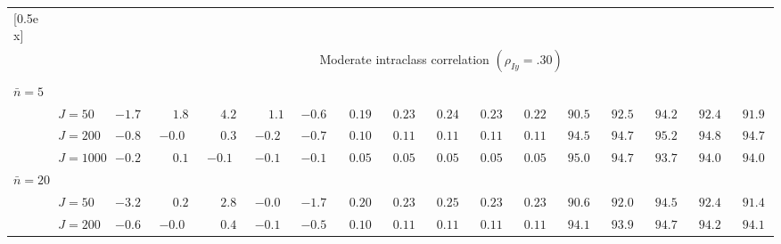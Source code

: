 \begin{sidewaystable}
\begin{threeparttable}
\begin{tabular}{llccccccccccccccc}
[0.5ex]\hline\\[-1.6ex] 
& & \multicolumn{15}{c}{Moderate intraclass correlation $(\rho_{Iy}=.30)$} \\[0.6ex]\hline\\[-1.8ex]
\multicolumn{4}{l}{$\bar{n}=5$} \\  & \nopagebreak $\;J=50$  & ${-}1.7\phantom{0}$ & $\phantom{-}1.8\phantom{0}$ & $\phantom{-}4.2\phantom{0}$ & $\phantom{-}1.1\phantom{0}$ & ${-}0.6\phantom{0}$ & $\phantom{0}0.19\phantom{0}$ & $\phantom{0}0.23\phantom{0}$ & $\phantom{0}0.24\phantom{0}$ & $\phantom{0}0.23\phantom{0}$ & $\phantom{0}0.22\phantom{0}$ & $\phantom{0}90.5\phantom{0}$ & $\phantom{0}92.5\phantom{0}$ & $\phantom{0}94.2\phantom{0}$ & $\phantom{0}92.4\phantom{0}$ & $\phantom{0}91.9\phantom{0}$ \\
 & \nopagebreak $\;J=200$  & ${-}0.8\phantom{0}$ & ${-}0.0\phantom{0}$ & $\phantom{-}0.3\phantom{0}$ & ${-}0.2\phantom{0}$ & ${-}0.7\phantom{0}$ & $\phantom{0}0.10\phantom{0}$ & $\phantom{0}0.11\phantom{0}$ & $\phantom{0}0.11\phantom{0}$ & $\phantom{0}0.11\phantom{0}$ & $\phantom{0}0.11\phantom{0}$ & $\phantom{0}94.5\phantom{0}$ & $\phantom{0}94.7\phantom{0}$ & $\phantom{0}95.2\phantom{0}$ & $\phantom{0}94.8\phantom{0}$ & $\phantom{0}94.7\phantom{0}$ \\
 & \nopagebreak $\;J=1000$  & ${-}0.2\phantom{0}$ & $\phantom{-}0.1\phantom{0}$ & ${-}0.1\phantom{0}$ & ${-}0.1\phantom{0}$ & ${-}0.1\phantom{0}$ & $\phantom{0}0.05\phantom{0}$ & $\phantom{0}0.05\phantom{0}$ & $\phantom{0}0.05\phantom{0}$ & $\phantom{0}0.05\phantom{0}$ & $\phantom{0}0.05\phantom{0}$ & $\phantom{0}95.0\phantom{0}$ & $\phantom{0}94.7\phantom{0}$ & $\phantom{0}93.7\phantom{0}$ & $\phantom{0}94.0\phantom{0}$ & $\phantom{0}94.0\phantom{0}$ \\
\multicolumn{4}{l}{$\bar{n}=20$} \\  & \nopagebreak $\;J=50$  & ${-}3.2\phantom{0}$ & $\phantom{-}0.2\phantom{0}$ & $\phantom{-}2.8\phantom{0}$ & ${-}0.0\phantom{0}$ & ${-}1.7\phantom{0}$ & $\phantom{0}0.20\phantom{0}$ & $\phantom{0}0.23\phantom{0}$ & $\phantom{0}0.25\phantom{0}$ & $\phantom{0}0.23\phantom{0}$ & $\phantom{0}0.23\phantom{0}$ & $\phantom{0}90.6\phantom{0}$ & $\phantom{0}92.0\phantom{0}$ & $\phantom{0}94.5\phantom{0}$ & $\phantom{0}92.4\phantom{0}$ & $\phantom{0}91.4\phantom{0}$ \\
 & \nopagebreak $\;J=200$  & ${-}0.6\phantom{0}$ & ${-}0.0\phantom{0}$ & $\phantom{-}0.4\phantom{0}$ & ${-}0.1\phantom{0}$ & ${-}0.5\phantom{0}$ & $\phantom{0}0.10\phantom{0}$ & $\phantom{0}0.11\phantom{0}$ & $\phantom{0}0.11\phantom{0}$ & $\phantom{0}0.11\phantom{0}$ & $\phantom{0}0.11\phantom{0}$ & $\phantom{0}94.1\phantom{0}$ & $\phantom{0}93.9\phantom{0}$ & $\phantom{0}94.7\phantom{0}$ & $\phantom{0}94.2\phantom{0}$ & $\phantom{0}94.1\phantom{0}$ \\

\end{tabular}
\end{threeparttable}
\end{sidewaystable}
